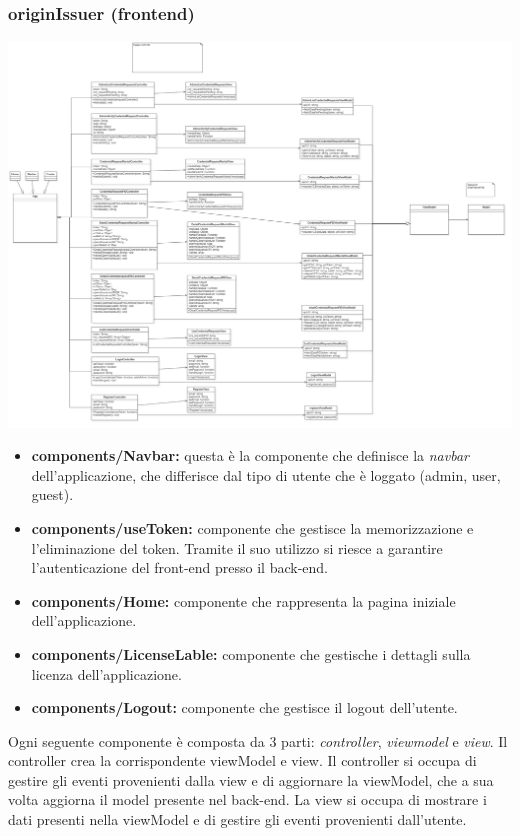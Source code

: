 \subsubsection{originIssuer (frontend)} 
\includegraphics[scale=0.2]{./res/img/frontendissuer.png}
\begin{itemize}
    \item \textbf{components/Navbar:} questa è la componente che definisce la \textit{navbar} dell'applicazione, che differisce dal tipo di utente che è loggato (admin, user, guest).
    \item \textbf{components/useToken:} componente che gestisce la memorizzazione e l'eliminazione del token. Tramite il suo utilizzo si riesce a garantire l'autenticazione del front-end presso il back-end.
    \item \textbf{components/Home:} componente che rappresenta la pagina iniziale dell'applicazione.
    \item \textbf{components/LicenseLable:} componente che gestische i dettagli sulla licenza dell'applicazione.
    \item \textbf{components/Logout:} componente che gestisce il logout dell'utente.
\end{itemize}

Ogni seguente componente è composta da 3 parti: \textit{controller}, \textit{viewmodel} e \textit{view}. Il controller crea la corrispondente
viewModel e view. Il controller si occupa di gestire gli eventi provenienti dalla view e di aggiornare la viewModel, che a sua volta aggiorna 
il model presente nel back-end. La view si occupa di mostrare i dati presenti nella viewModel e di gestire gli eventi provenienti dall'utente.

